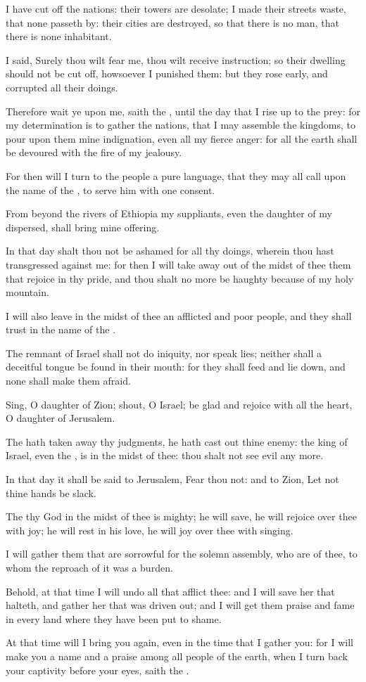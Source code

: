 \verse I have cut off the nations: their towers are desolate; I made their streets waste, that none passeth by: their cities are destroyed, so that there is no man, that there is none inhabitant.

\verse I said, Surely thou wilt fear me, thou wilt receive instruction; so their dwelling should not be cut off, howsoever I punished them: but they rose early, and corrupted all their doings.

\verse Therefore wait ye upon me, saith the \LORD, until the day that I rise up to the prey: for my determination is to gather the nations, that I may assemble the kingdoms, to pour upon them mine indignation, even all my fierce anger: for all the earth shall be devoured with the fire of my jealousy.

\verse For then will I turn to the people a pure language, that they may all call upon the name of the \LORD, to serve him with one consent.

\verse From beyond the rivers of Ethiopia my suppliants, even the daughter of my dispersed, shall bring mine offering.

\verse In that day shalt thou not be ashamed for all thy doings, wherein thou hast transgressed against me: for then I will take away out of the midst of thee them that rejoice in thy pride, and thou shalt no more be haughty because of my holy mountain.

\verse I will also leave in the midst of thee an afflicted and poor people, and they shall trust in the name of the \LORD.

\verse The remnant of Israel shall not do iniquity, nor speak lies; neither shall a deceitful tongue be found in their mouth: for they shall feed and lie down, and none shall make them afraid.

\verse Sing, O daughter of Zion; shout, O Israel; be glad and rejoice with all the heart, O daughter of Jerusalem.

\verse The \LORD hath taken away thy judgments, he hath cast out thine enemy: the king of Israel, even the \LORD, is in the midst of thee: thou shalt not see evil any more.

\verse In that day it shall be said to Jerusalem, Fear thou not: and to Zion, Let not thine hands be slack.

\verse The \LORD thy God in the midst of thee is mighty; he will save, he will rejoice over thee with joy; he will rest in his love, he will joy over thee with singing.

\verse I will gather them that are sorrowful for the solemn assembly, who are of thee, to whom the reproach of it was a burden.

\verse Behold, at that time I will undo all that afflict thee: and I will save her that halteth, and gather her that was driven out; and I will get them praise and fame in every land where they have been put to shame.

\verse At that time will I bring you again, even in the time that I gather you: for I will make you a name and a praise among all people of the earth, when I turn back your captivity before your eyes, saith the \LORD.

